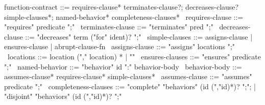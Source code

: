 \begin{syntax}
  function-contract ::= requires-clause* terminates-clause?;
                        decreases-clause? simple-clauses*;
                        named-behavior* completeness-clauses*
  \
  requires-clause ::= "requires" predicate ";"
  \
  terminates-clause ::= "terminates" pred ";"
  \
  decreases-clause ::= "decreases" term ("for" ident)? ";"
  \
  simple-clauses ::= assigns-clause | ensures-clause | abrupt-clause-fn
  \
  assigns-clause ::= "assigns" locations ";"
  \
  locations ::= location ("," location) * | "\nothing"
  \
  ensures-clauses ::= "ensures" predicate ";"
  \
  named-behavior ::= "behavior" id ":" behavior-body
  \
  behavior-body ::= assumes-clause*
                     {requires-clause}*
                    simple-clauses* \
  assumes-clause ::= "assumes" predicate ";"
  \
  completeness-clauses ::= "complete" "behaviors" (id (","id)*)? ";";
     | "disjoint" "behaviors" (id (","id)*)? ";"
\end{syntax}

